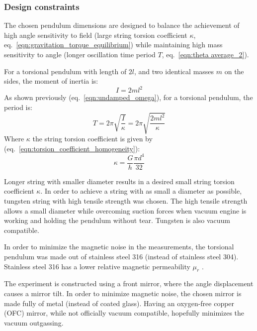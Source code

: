 \documentclass[\main/master.tex]{subfiles}
\begin{document}
\subsubsection{Design constraints}
\par\noindent
The chosen pendulum dimensions are designed to balance the achievement of high angle sensitivity to field (large string torsion coefficient $\kappa$, eq.~\ref{eqn:gravitation_torque_equilibrium}) while maintaining high mass sensitivity to angle (longer oscillation time period $T$, eq.~\ref{eqn:theta average_2}). 
\par\noindent
For a torsional pendulum with length of $2l$, and two identical masses $m$ on the sides, the moment of inertia is:
\begin{equation}
I = 2ml^2     \label{eqn:moment_inertia_2}
\end{equation} 
As shown previously (eq.~\ref{eqn:undamped_omega}), for a torsional pendulum, the period is:
\begin{equation}
T = 2\pi\sqrt{\frac{I}{\kappa}}= 2\pi\sqrt{\frac{2ml^2}{\kappa}}   \label{eqn:undamped_motion_equation_3}
\end{equation}
Where $\kappa$ the string torsion coefficient is given by (eq.~\ref{eqn:torsion_coefficient_homogeneity}):
\begin{equation}
\kappa = \frac{G}{h} \frac{\pi d^4}{32}    \label{eqn:torsion_coefficient}
\end{equation}
\par\noindent
Longer string with smaller diameter results in a desired small string torsion coefficient $\kappa$. In order to achieve a string with as small a diameter as possible, tungsten string with high tensile strength was chosen. The high tensile strength allows a small diameter while overcoming suction forces when vacuum engine is working and holding the pendulum without tear. Tungsten is also vacuum compatible. 
\par\noindent
In order to minimize the magnetic noise in the measurements, the torsional pendulum was made out of stainless steel 316 (instead of stainless steel 304). Stainless steel 316 has a lower relative magnetic permeability $\mu_r$ \cite{SS316}.
\par\noindent
The experiment is constructed using a front mirror, where the angle displacement causes a mirror tilt. In order to minimize magnetic noise, the chosen mirror is made fully of metal (instead of coated glass). Having an oxygen-free copper (OFC) mirror, while not officially vacuum compatible, hopefully minimizes the vacuum outgassing.
\end{document}
